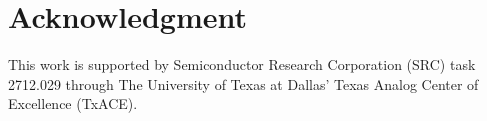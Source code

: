 \documentclass[conference]{IEEEtran}
\begin{document}
		
		\section*{Acknowledgment}
		This work is supported by Semiconductor Research Corporation (SRC) task 2712.029 through The University of Texas at Dallas' Texas Analog Center of Excellence (TxACE).
		
		
		
		
	
\end{document}
